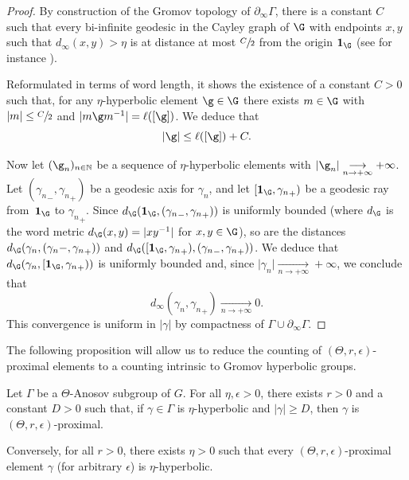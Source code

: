 \Changelback

\begin{proof}
By construction of the Gromov topology of $\partial_\infty \Gamma$, there is a constant $C$ such that every bi-infinite geodesic in the Cayley graph of $\G$ with endpoints $x,y$ such that $d_\infty(x,y)>\eta$ is at distance at most $\sfrac{C}{2}$ from the origin $\mathbf 1_\G$ (see for instance \cite[Lem.\,7.1]{CK}).

Reformulated in terms of word length, it shows the existence of a constant $C>0$ such that, for any $\eta$-hyperbolic element $\g\in \G$ there exists $m\in \G$ with $\vert m \vert \leq \sfrac C 2$ and $\vert m\g m^{-1}\vert = \ell([\g])$. We deduce that
\[\vert \g \vert \leq \ell([\g])+ C.\]

Now let $(\g_n)_{n\in\mathbb N}$ be a sequence of $\eta$-hyperbolic elements with $\vert \g_n \vert \underset{n\to +\infty}{\longrightarrow} +\infty$. Let $({\gamma_n}_-, {\gamma_n}_+)$ be a geodesic axis for $\gamma_n$, and let $[\mathbf 1_\G, {\gamma_n}_+)$ be a geodesic ray from~$\mathbf 1_\G$ to ${\gamma_n}_+$. Since $d_\G(\mathbf 1_\G, ({\gamma_n}_-, {\gamma_n}_+))$ is uniformly bounded (where $d_\G$ is the word metric $d_\G(x,y)=\vert xy^{-1}\vert$ for $x,y\in \G$), so are the distances $d_\G(\gamma_n, ({\gamma_n}-, {\gamma_n}_+))$ and $d_\G([\mathbf 1_\G, {\gamma_n}_+), ({\gamma_n}_-, {\gamma_n}_+))$. We deduce that $d_\G(\gamma_n, [\mathbf 1_\G, {\gamma_n}_+))$ is uniformly bounded and, since $\vert \gamma_n \vert \underset{n\to +\infty}{\longrightarrow} +\infty$, we conclude that \[d_\infty(\gamma_n, {\gamma_n}_+)\underset{n\to +\infty}{\longrightarrow} 0.\]
This convergence is uniform in $\vert \gamma \vert$ by compactness of $\Gamma \cup \partial_\infty \Gamma$.
\end{proof}

The following proposition will allow us to reduce the counting of $(\Theta,r,\epsilon)$-proximal elements to a counting intrinsic to Gromov hyperbolic groups.

\begin{prop} \label{prop - Proximal VS Hyperbolic}
Let $\Gamma$ be a $\Theta$-Anosov subgroup of $G$. For all $\eta,\epsilon>0$, there exists $r>0$ and a constant $D>0$ such that, if $\gamma \in \Gamma$ is $\eta$-hyperbolic and $\vert \gamma \vert \geq D$, then $\gamma$ is $(\Theta,r,\epsilon)$-proximal.

Conversely, for all $r>0$, there exists $\eta>0$ such that every $(\Theta,r,\epsilon)$-proximal element $\gamma$ (for arbitrary $\epsilon$) is $\eta$-hyperbolic.
\end{prop}

